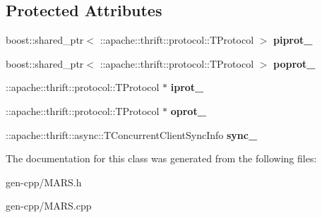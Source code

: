 \subsection*{Protected Attributes}
\begin{DoxyCompactItemize}
\item 
\mbox{\label{classMARS_1_1MARSConcurrentClient_abbc464f5cd88899e7b55b365b8999c14}} 
boost\+::shared\+\_\+ptr$<$ \+::apache\+::thrift\+::protocol\+::\+T\+Protocol $>$ {\bfseries piprot\+\_\+}
\item 
\mbox{\label{classMARS_1_1MARSConcurrentClient_a41f7e0d838a100400b56cc5763f5bf40}} 
boost\+::shared\+\_\+ptr$<$ \+::apache\+::thrift\+::protocol\+::\+T\+Protocol $>$ {\bfseries poprot\+\_\+}
\item 
\mbox{\label{classMARS_1_1MARSConcurrentClient_a7b6a397647c0f402fd48b8167afa3a97}} 
\+::apache\+::thrift\+::protocol\+::\+T\+Protocol $\ast$ {\bfseries iprot\+\_\+}
\item 
\mbox{\label{classMARS_1_1MARSConcurrentClient_aca981420dbb6290f7ede939b6e5e65a5}} 
\+::apache\+::thrift\+::protocol\+::\+T\+Protocol $\ast$ {\bfseries oprot\+\_\+}
\item 
\mbox{\label{classMARS_1_1MARSConcurrentClient_a795ec38fc8ea43d932d8de438d2a3678}} 
\+::apache\+::thrift\+::async\+::\+T\+Concurrent\+Client\+Sync\+Info {\bfseries sync\+\_\+}
\end{DoxyCompactItemize}


The documentation for this class was generated from the following files\+:\begin{DoxyCompactItemize}
\item 
gen-\/cpp/M\+A\+R\+S.\+h\item 
gen-\/cpp/M\+A\+R\+S.\+cpp\end{DoxyCompactItemize}
